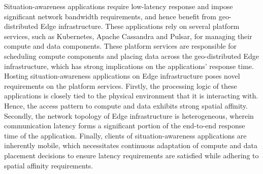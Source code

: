 \begin{summary}
Situation-awareness applications require low-latency response and impose significant network bandwidth requirements, and hence benefit from geo-distributed Edge infrastructure. These applications rely on several platform services, such as Kubernetes, Apache Cassandra and Pulsar, for managing their compute and data components. These platform services are responsible for scheduling compute components and placing data across the geo-distributed Edge infrastructure, which has strong implications on the applications’ response time. Hosting situation-awareness applications on Edge infrastructure poses novel requirements on the platform services. Firstly, the processing logic of these applications is closely tied to the physical environment that it is interacting with. Hence, the access pattern to compute and data exhibits strong spatial affinity. Secondly, the network topology of Edge infrastructure is heterogeneous, wherein communication latency forms a significant portion of the end-to-end response time of the application. Finally, clients of situation-awareness applications are inherently mobile, which necessitates continuous adaptation of compute and data placement decisions to ensure latency requirements are satisfied while adhering to spatial affinity requirements.


\end{summary}
